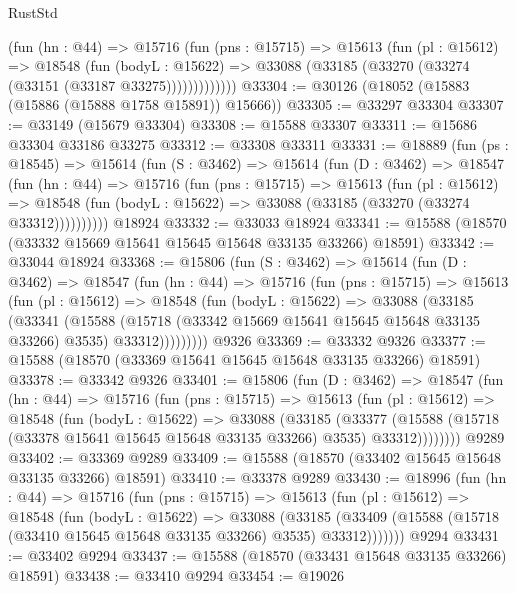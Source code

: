 \begin{lexlean}{RustStd}
\begin{coremodule}
            (fun (hn : @44) =>
            @15716
              (fun (pns : @15715) =>
              @15613
                (fun (pl : @15612) =>
                @18548
                  (fun (bodyL : @15622) =>
                  @33088 (@33185 (@33270 (@33274 (@33151 (@33187 @33275)))))))))))))
@33304 := @30126 (@18052 (@15883 (@15886 (@15888 @1758 @15891)) @15666))
@33305 := @33297 @33304
@33307 := @33149 (@15679 @33304)
@33308 := @15588 @33307
@33311 := @15686 @33304 @33186 @33275
@33312 := @33308 @33311
@33331 := @18889
    (fun (ps : @18545) =>
    @15614
      (fun (S : @3462) =>
      @15614
        (fun (D : @3462) =>
        @18547
          (fun (hn : @44) =>
          @15716
            (fun (pns : @15715) =>
            @15613
              (fun (pl : @15612) =>
              @18548 (fun (bodyL : @15622) => @33088 (@33185 (@33270 (@33274 @33312))))))))))
    @18924
@33332 := @33033 @18924
@33341 := @15588 (@18570 (@33332 @15669 @15641 @15645 @15648 @33135 @33266) @18591)
@33342 := @33044 @18924
@33368 := @15806
    (fun (S : @3462) =>
    @15614
      (fun (D : @3462) =>
      @18547
        (fun (hn : @44) =>
        @15716
          (fun (pns : @15715) =>
          @15613
            (fun (pl : @15612) =>
            @18548
              (fun (bodyL : @15622) =>
              @33088
                (@33185
                  (@33341
                    (@15588
                      (@15718 (@33342 @15669 @15641 @15645 @15648 @33135 @33266) @3535)
                      @33312)))))))))
    @9326
@33369 := @33332 @9326
@33377 := @15588 (@18570 (@33369 @15641 @15645 @15648 @33135 @33266) @18591)
@33378 := @33342 @9326
@33401 := @15806
    (fun (D : @3462) =>
    @18547
      (fun (hn : @44) =>
      @15716
        (fun (pns : @15715) =>
        @15613
          (fun (pl : @15612) =>
          @18548
            (fun (bodyL : @15622) =>
            @33088
              (@33185
                (@33377
                  (@15588 (@15718 (@33378 @15641 @15645 @15648 @33135 @33266) @3535) @33312))))))))
    @9289
@33402 := @33369 @9289
@33409 := @15588 (@18570 (@33402 @15645 @15648 @33135 @33266) @18591)
@33410 := @33378 @9289
@33430 := @18996
    (fun (hn : @44) =>
    @15716
      (fun (pns : @15715) =>
      @15613
        (fun (pl : @15612) =>
        @18548
          (fun (bodyL : @15622) =>
          @33088
            (@33185
              (@33409 (@15588 (@15718 (@33410 @15645 @15648 @33135 @33266) @3535) @33312)))))))
    @9294
@33431 := @33402 @9294
@33437 := @15588 (@18570 (@33431 @15648 @33135 @33266) @18591)
@33438 := @33410 @9294
@33454 := @19026

\end{coremodule}
\end{lexlean}
